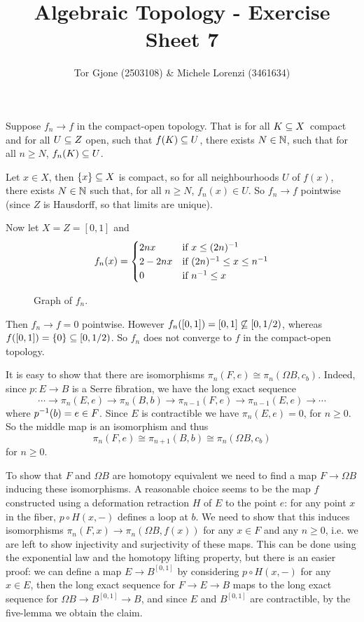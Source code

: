 \documentclass[a4paper,11pt,english]{article}
\title{\textbf{Algebraic Topology} - Exercise Sheet 7}
\author{Tor Gjone (2503108) \& Michele Lorenzi (3461634)}
\begin{document}
\mmaketitle

\begin{exercise}[1]

Suppose $f_n \to f$ in the compact-open topology. That is for all $K \subseteq
X$ compact and for all $U \subseteq Z$ open, such that $f(K)\subseteq U$, there exists $N \in \mathbb{N}$, such that for all
$n \ge N$, $f_n(K) \subseteq U$.

Let $x \in X$, then $\{x\} \subseteq X$ is compact, so for all neighbourhoods $U$ of $f(x)$, there
exists $N\in\mathbb{N}$ such that, for all $n\ge N$, $f_n(x) \in U$. So $f_n \to
f$ pointwise (since $Z$ is Hausdorff, so that limits are unique).

Now let $X = Z = [0,1]$ and 
\[ f_n(x) = \begin{cases} 
2nx &\text{if } x \le (2n)^{-1} \\
2 - 2nx &\text{if } (2n)^{-1} \le x \le n^{-1} \\
0 &\text{if } n^{-1} \le x
 \end{cases} \]

\begin{figure}[h]
\centering

\caption{Graph of $f_n$.}
\label{fig:1}
\end{figure}

Then $f_n \to f = 0$ pointwise. However $f_n([0,1]) =
[0,1] \not\subseteq [0,1/2)$, whereas $f([0,1]) = \{0\} \subseteq [0,1/2)$. So $f_n$ does
not converge to $f$ in the compact-open topology.
\end{exercise}



\begin{exercise}[2]

It is easy to show that there are isomorphisms $\pi_{n}(F,e) \cong \pi_n(\Omega B,c_b)$. Indeed, since $p : E \to B$ is a Serre fibration, we have the long exact
sequence
\[ \cdots \to \pi_n(E,e) \to \pi_n(B,b) \to \pi_{n-1}(F,e) \to \pi_{n-1}(E,e) \to
\cdots \]
where $p^{-1}(b)=e \in F$. Since $E$ is contractible we have $\pi_n(E,e) = 0$,
for $n \ge 0$. So the middle map is an isomorphism and thus 
\[ \pi_{n}(F,e) \cong \pi_{n+1}(B,b) \cong \pi_n(\Omega B,c_b) \]
for $n \ge 0$.

To show that $F$ and $\Omega B$ are homotopy equivalent we need to find a map $F\to\Omega B$ inducing these isomorphisms. A reasonable choice seems to be the map $f$ constructed using a deformation retraction $H$ of $E$ to the point $e$: for any point $x$ in the fiber,  $p\circ H(x,-)$ defines a loop at $b$. We need to show that this induces isomorphisms $\pi_n(F,x)\to\pi_n(\Omega B,f(x))$ for any $x\in F$ and any $n\geq0$, i.e. we are left to show injectivity and surjectivity of these maps. This can be done using the exponential law and the homotopy lifting property, but there is an easier proof: we can define a map $E\to B^{[0,1]}$ by considering $p\circ H(x,-)$ for any $x\in E$, then the long exact sequence for $F\to E\to B$ maps to the long exact sequence for $\Omega B\to B^{[0,1]}\to B$, and since $E$ and $B^{[0,1]}$ are contractible, by the five-lemma we obtain the claim.
\end{exercise}
\end{document}
